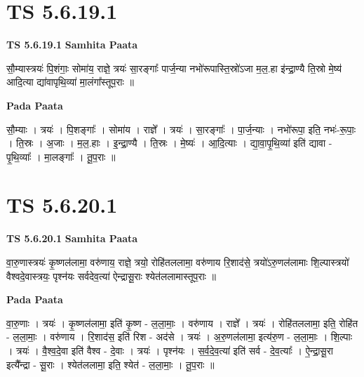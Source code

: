 \documentclass[17pt]{extarticle}
\begin{document}

\section{ TS 5.6.19.1 }

\textbf{TS 5.6.19.1 } \newline
\textbf{Samhita Paata} \newline

सौ॒म्यास्त्रयः॑ पि॒शंगाः॒ सोमा॑य॒ राज्ञे॒ त्रयः॑ सा॒रङ्गाः᳚ पार्ज॒न्या नभो॑रूपास्ति॒स्रो॑ऽजा म॒ल॒.हा इ॑न्द्रा॒ण्यै ति॒स्रो मे॒ष्य॑ आदि॒त्या द्या॑वापृथि॒व्या॑ मा॒लंगा᳚स्तूप॒राः ॥ \newline

\textbf{Pada Paata} \newline

सौ॒म्याः । त्रयः॑ । पि॒शङ्गाः᳚ । सोमा॑य । राज्ञे᳚ । त्रयः॑ । सा॒रङ्गाः᳚ । पा॒र्ज॒न्याः । नभो॑रूपा॒ इति॒ नभः॑-रू॒पाः॒ । ति॒स्रः । अ॒जाः । म॒ल॒.हाः । इ॒न्द्रा॒ण्यै । ति॒स्रः । मे॒ष्यः॑ । आ॒दि॒त्याः । द्या॒वा॒पृ॒थि॒व्या॑ इति॑ द्यावा - पृ॒थि॒व्याः᳚ । मा॒लङ्गाः᳚ । तू॒प॒राः ॥  \newline





\section{ TS 5.6.20.1 }

\textbf{TS 5.6.20.1 } \newline
\textbf{Samhita Paata} \newline

वा॒रु॒णास्त्रयः॑ कृ॒ष्णल॑लामा॒ वरु॑णाय॒ राज्ञे॒ त्रयो॒ रोहि॑तललामा॒ वरु॑णाय रि॒शाद॑से॒ त्रयो॑ऽरु॒णल॑लामाः शि॒ल्पास्त्रयो॑ वैश्वदे॒वास्त्रयः॒ पृश्न॑यः सर्वदेव॒त्या॑ ऐन्द्रासू॒राः श्येत॑ललामास्तूप॒राः ॥ \newline

\textbf{Pada Paata} \newline

वा॒रु॒णाः । त्रयः॑ । कृ॒ष्णल॑लामा॒ इति॑ कृ॒ष्ण - ल॒ला॒माः॒ । वरु॑णाय । राज्ञे᳚ । त्रयः॑ । रोहि॑तललामा॒ इति॒ रोहि॑त - ल॒ला॒माः॒ । वरु॑णाय । रि॒शाद॑स॒ इति॑ रिश - अद॑से । त्रयः॑ । अ॒रु॒णल॑लामा॒ इत्य॑रु॒ण - ल॒ला॒माः॒ । शि॒ल्पाः । त्रयः॑ । वै॒श्व॒दे॒वा इति॑ वैश्व - दे॒वाः । त्रयः॑ । पृश्न॑यः । स॒र्व॒दे॒व॒त्या॑ इति॑ सर्व - दे॒व॒त्याः᳚ । ऐ॒न्द्रा॒सू॒रा इत्यै᳚न्द्रा - सू॒राः । श्येत॑ललामा॒ इति॒ श्येत॑ - ल॒ला॒माः॒ । तू॒प॒राः ॥  \newline
\end{document}
